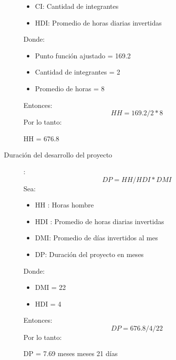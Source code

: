 \begin{description}
\begin{itemize}
                        \item CI: Cantidad de integrantes
                        \item HDI: Promedio de horas diarias invertidas
                    \end{itemize}
                    Donde:
                    \begin{itemize}
                        \item Punto función ajustado = 169.2
                        \item Cantidad de integrantes = 2
                        \item Promedio de horas = 8
                    \end{itemize}
                    Entonces:
                    \begin{equation}
                        HH = 169.2 / 2 * 8
                    \end{equation}
                    Por lo tanto:
                    \begin{center}
                        HH = 676.8
                    \end{center}
                \item [Duración del desarrollo del proyecto]:
                    \begin{equation}
                        DP = HH / HDI * DMI
                        \label{eq:EqEstimacionEsfuerzoHH}
                    \end{equation}
                    Sea:
                    \begin{itemize}
                        \item HH : Horas hombre
                        \item HDI : Promedio de horas diarias invertidas
                        \item DMI: Promedio de días invertidos al mes
                        \item DP: Duración del proyecto en meses
                    \end{itemize}
                    Donde:
                    \begin{itemize}
                        \item DMI = 22
                        \item HDI = 4
                    \end{itemize}
                    Entonces:
                    \begin{equation}
                        DP = 676.8 / 4 / 22
                    \end{equation}
                    Por lo tanto:
                    \begin{center}
                        DP = 7.69 meses  meses 21 días\
                    \end{center} 
                    

\end{description}
